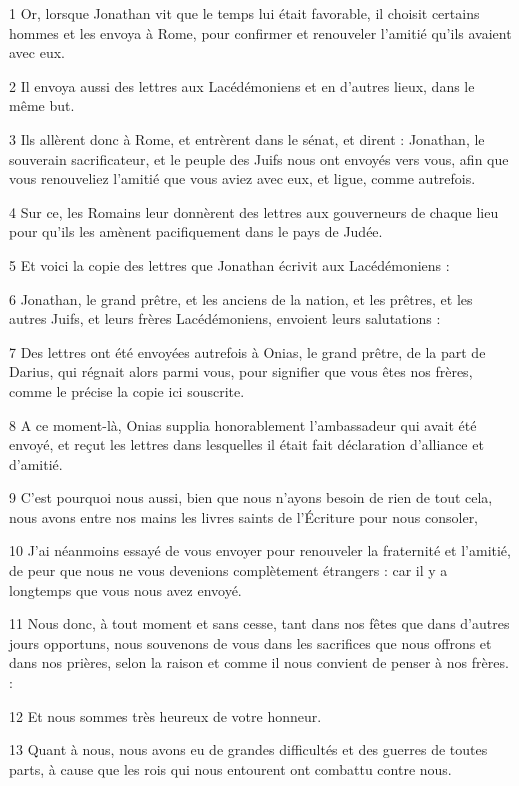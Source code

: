 \par 1 Or, lorsque Jonathan vit que le temps lui était favorable, il choisit certains hommes et les envoya à Rome, pour confirmer et renouveler l'amitié qu'ils avaient avec eux.
\par 2 Il envoya aussi des lettres aux Lacédémoniens et en d'autres lieux, dans le même but.
\par 3 Ils allèrent donc à Rome, et entrèrent dans le sénat, et dirent : Jonathan, le souverain sacrificateur, et le peuple des Juifs nous ont envoyés vers vous, afin que vous renouveliez l'amitié que vous aviez avec eux, et ligue, comme autrefois.
\par 4 Sur ce, les Romains leur donnèrent des lettres aux gouverneurs de chaque lieu pour qu'ils les amènent pacifiquement dans le pays de Judée.
\par 5 Et voici la copie des lettres que Jonathan écrivit aux Lacédémoniens :
\par 6 Jonathan, le grand prêtre, et les anciens de la nation, et les prêtres, et les autres Juifs, et leurs frères Lacédémoniens, envoient leurs salutations :
\par 7 Des lettres ont été envoyées autrefois à Onias, le grand prêtre, de la part de Darius, qui régnait alors parmi vous, pour signifier que vous êtes nos frères, comme le précise la copie ici souscrite.
\par 8 A ce moment-là, Onias supplia honorablement l'ambassadeur qui avait été envoyé, et reçut les lettres dans lesquelles il était fait déclaration d'alliance et d'amitié.
\par 9 C'est pourquoi nous aussi, bien que nous n'ayons besoin de rien de tout cela, nous avons entre nos mains les livres saints de l'Écriture pour nous consoler,
\par 10 J'ai néanmoins essayé de vous envoyer pour renouveler la fraternité et l'amitié, de peur que nous ne vous devenions complètement étrangers : car il y a longtemps que vous nous avez envoyé.
\par 11 Nous donc, à tout moment et sans cesse, tant dans nos fêtes que dans d'autres jours opportuns, nous souvenons de vous dans les sacrifices que nous offrons et dans nos prières, selon la raison et comme il nous convient de penser à nos frères. :
\par 12 Et nous sommes très heureux de votre honneur.
\par 13 Quant à nous, nous avons eu de grandes difficultés et des guerres de toutes parts, à cause que les rois qui nous entourent ont combattu contre nous.
